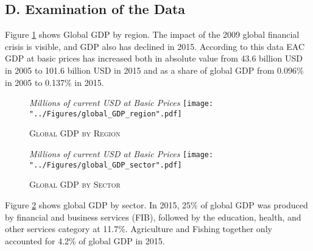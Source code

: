 \documentclass[a4paper]{article}
\begin{document}
\newpage

\subsection*{D. Examination of the Data}
\setcounter{table}{0}
\renewcommand{\thetable}{D\arabic{table}}
\setcounter{figure}{0}
\renewcommand{\thefigure}{D\arabic{figure}}

Figure \ref{fig:wld_GDP_reg} shows Global GDP by region. The impact of the 2009 global financial crisis is visible, and GDP also has declined in 2015. %
According to this data EAC GDP at basic prices has increased both in absolute value from 43.6 billion USD in 2005 to 101.6 billion USD in 2015 and as a share of global GDP from 0.096\% in 2005 to 0.137\% in 2015. \newline

\begin{figure}[h!] \vspace{-6mm}
\centering
\caption{\label{fig:wld_GDP_reg}\textsc{Global GDP by Region}}
\small{\textit{Millions of current USD at Basic Prices}}
\texttt{[image: "../Figures/global\_GDP\_region".pdf]} %
\vspace{-8mm}
\end{figure}
\FloatBarrier

\begin{figure}[h!] \vspace{-5mm}
\centering
\caption{\label{fig:wld_GDP_sec}\textsc{Global GDP by Sector}}
\small{\textit{Millions of current USD at Basic Prices}}
\texttt{[image: "../Figures/global\_GDP\_sector".pdf]} %
\vspace{-20mm}
\end{figure}
\FloatBarrier
\newpage

Figure \ref{fig:wld_GDP_sec} shows global GDP by sector. In 2015, 25\% of global GDP was produced by financial and business services (FIB), followed by the education, health, and other services category at 11.7\%. Agriculture and Fishing together only accounted for 4.2\% of global GDP in 2015. \newline
\end{document}
